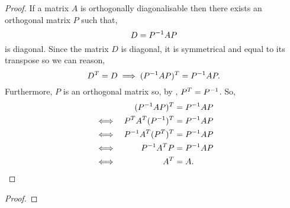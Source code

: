 \documentclass[../MathsNotesBase.tex]{subfiles}
\begin{document}
{		\bigskip
		\begin{proof}
			If a matrix $A$ is orthogonally diagonalisable then there exists an orthogonal matrix $P$ such that,
			\[ D = {P}^{-1}AP \]
			is diagonal. Since the matrix $D$ is diagonal, it is symmetrical and equal to its transpose so we can reason,
			\[ D^T = D \implies ({P}^{-1}AP)^T = {P}^{-1}AP. \]
			Furthermore, $P$ is an orthogonal matrix so, by \addref, ${ P^T = {P}^{-1} }$. So,
			\[\begin{aligned}
				&& ({P}^{-1}AP)^T &= {P}^{-1}AP \\
				&\iff & P^T A^T ({P}^{-1})^T &= {P}^{-1}AP \\
				&\iff & {P}^{-1} A^T (P^T)^T &= {P}^{-1}AP \\
				&\iff & {P}^{-1} A^T P &= {P}^{-1}AP \\
				&\iff & A^T &= A.  \qedhere
			\end{aligned}\]
		\end{proof}
	
		\bigskip
		\begin{proof}
		\end{proof}
	}


\end{document}
